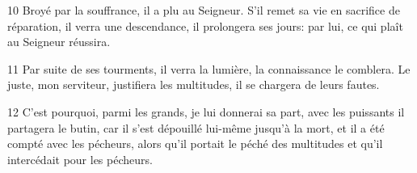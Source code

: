 
10 Broyé par la souffrance, il a plu au Seigneur. S’il remet sa vie en sacrifice de réparation, il verra une descendance, il prolongera ses jours: par lui, ce qui plaît au Seigneur réussira.

11 Par suite de ses tourments, il verra la lumière, la connaissance le comblera. Le juste, mon serviteur, justifiera les multitudes, il se chargera de leurs fautes.

12 C’est pourquoi, parmi les grands, je lui donnerai sa part, avec les puissants il partagera le butin, car il s’est dépouillé lui-même jusqu’à la mort, et il a été compté avec les pécheurs, alors qu’il portait le péché des multitudes et qu’il intercédait pour les pécheurs.
